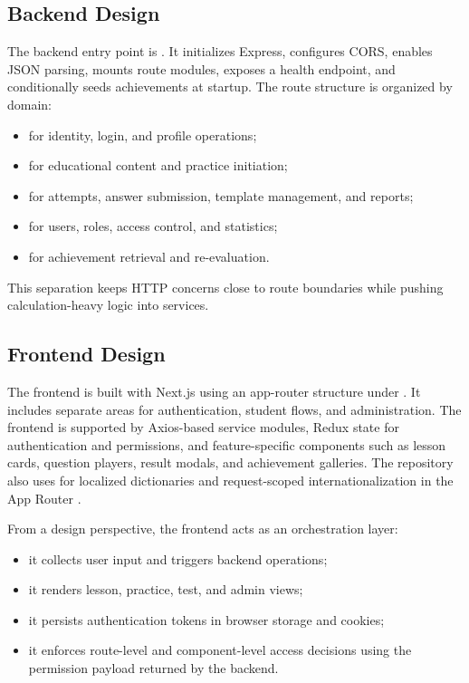\subsection{Backend Design}

The backend entry point is . It initializes Express, configures CORS, enables JSON parsing, mounts route modules, exposes a health endpoint, and conditionally seeds achievements at startup. The route structure is organized by domain:

\begin{itemize}
  \item {} for identity, login, and profile operations;
  \item {} for educational content and practice initiation;
  \item {} for attempts, answer submission, template management, and reports;
  \item {} for users, roles, access control, and statistics;
  \item {} for achievement retrieval and re-evaluation.
\end{itemize}

This separation keeps HTTP concerns close to route boundaries while pushing calculation-heavy logic into services.

\subsection{Frontend Design}

The frontend is built with Next.js using an app-router structure under . It includes separate areas for authentication, student flows, and administration. The frontend is supported by Axios-based service modules, Redux state for authentication and permissions, and feature-specific components such as lesson cards, question players, result modals, and achievement galleries. The repository also uses  for localized dictionaries and request-scoped internationalization in the App Router \cite{nextintl-docs}.

From a design perspective, the frontend acts as an orchestration layer:
\begin{itemize}
  \item it collects user input and triggers backend operations;
  \item it renders lesson, practice, test, and admin views;
  \item it persists authentication tokens in browser storage and cookies;
  \item it enforces route-level and component-level access decisions using the permission payload returned by the backend.
\end{itemize}

